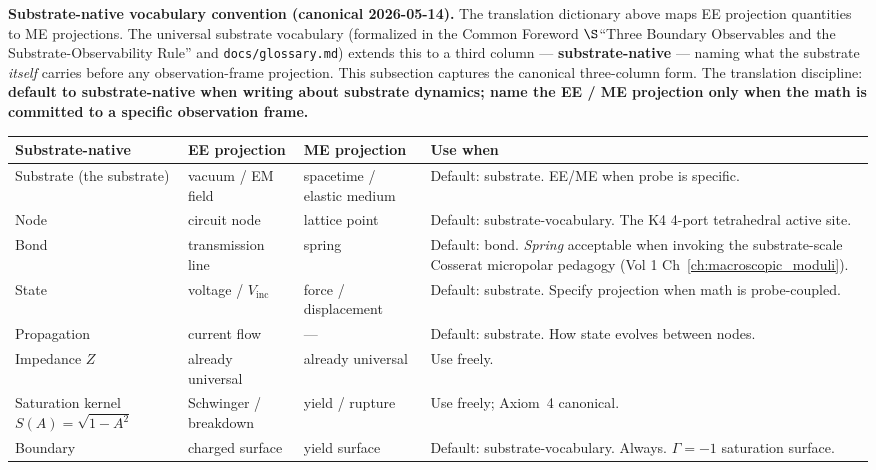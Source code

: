 \textbf{Substrate-native vocabulary convention (canonical 2026-05-14).}
The translation dictionary above maps EE projection quantities to ME
projections. The universal substrate vocabulary (formalized in the Common
Foreword $\S$``Three Boundary Observables and the Substrate-Observability
Rule'' and \texttt{docs/glossary.md}) extends this to a third column ---
\textbf{substrate-native} --- naming what the substrate \emph{itself} carries
before any observation-frame projection. This subsection captures the canonical
three-column form. The translation discipline: \textbf{default to substrate-native
when writing about substrate dynamics; name the EE / ME projection only when
the math is committed to a specific observation frame.}

\begin{center}\small
\begin{tabular}{|p{2.8cm}|p{2.5cm}|p{2.5cm}|p{4.5cm}|}
\hline
\textbf{Substrate-native} & \textbf{EE projection} & \textbf{ME projection} & \textbf{Use when} \\
\hline
Substrate (the substrate) & vacuum / EM field & spacetime / elastic medium &
  Default: substrate. EE/ME when probe is specific. \\
\hline
Node & circuit node & lattice point &
  Default: substrate-vocabulary. The K4 4-port tetrahedral active site. \\
\hline
Bond & transmission line & spring &
  Default: bond. \emph{Spring} acceptable when invoking the substrate-scale Cosserat micropolar pedagogy (Vol 1 Ch~\ref{ch:macroscopic_moduli}). \\
\hline
State & voltage / $V_{\text{inc}}$ & force / displacement &
  Default: substrate. Specify projection when math is probe-coupled. \\
\hline
Propagation & current flow & --- &
  Default: substrate. How state evolves between nodes. \\
\hline
Impedance $Z$ & already universal & already universal & Use freely. \\
\hline
Saturation kernel $S(A) = \sqrt{1-A^2}$ & Schwinger / breakdown & yield / rupture &
  Use freely; Axiom~4 canonical. \\
\hline
Boundary & charged surface & yield surface &
  Default: substrate-vocabulary. Always. $\Gamma = -1$ saturation surface. \\
\hline

\end{tabular}
\end{center}
